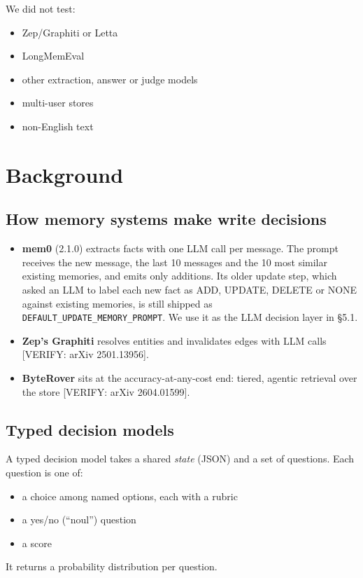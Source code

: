 \documentclass[11pt]{article}
\newcommand{\src}[1]{}
\begin{document}
We did not test:

\begin{itemize}
\item Zep/Graphiti or Letta
\item LongMemEval
\item other extraction, answer or judge models
\item multi-user stores
\item non-English text
\end{itemize}
\section{Background}
\subsection{How memory systems make write decisions}
\begin{itemize}
\item \textbf{mem0} (2.1.0) extracts facts with one LLM call per message. The prompt receives the new message, the last 10\src{src/engram/flags.py (extract_last_k, as mem0 2.1.0)} messages and the 10\src{src/engram/config.py} most similar existing memories, and emits only additions. Its older update step, which asked an LLM to label each new fact as ADD, UPDATE, DELETE or NONE against existing memories, is still shipped as \texttt{DEFAULT\_\allowbreak{}UPDATE\_\allowbreak{}MEMORY\_\allowbreak{}PROMPT}. We use it as the LLM decision layer in \S{}5.1.
\item \textbf{Zep's Graphiti} resolves entities and invalidates edges with LLM calls [VERIFY: arXiv 2501.13956].
\item \textbf{ByteRover} sits at the accuracy-at-any-cost end: tiered, agentic retrieval over the store [VERIFY: arXiv 2604.01599].
\end{itemize}
\subsection{Typed decision models}
A typed decision model takes a shared \emph{state} (JSON) and a set of questions. Each question is one of:

\begin{itemize}
\item a choice among named options, each with a rubric
\item a yes/no (``noul'') question
\item a score
\end{itemize}
It returns a probability distribution per question.
\end{document}
